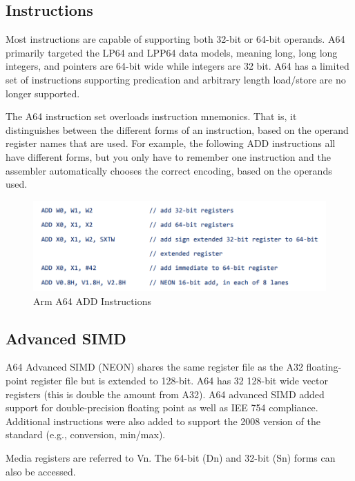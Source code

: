 \documentclass[12pt]{article}
\begin{document}
\subsection{Instructions}
\hspace{\parindent}Most instructions are capable of supporting both 32-bit or 64-bit operands. A64 primarily targeted the LP64 and LPP64 data models, meaning long, long long integers, and pointers are 64-bit wide while integers are 32 bit. A64 has a limited set of instructions supporting predication and arbitrary length load/store are no longer supported.\cite{a64instr2}\par
The A64 instruction set overloads instruction mnemonics. That is, it distinguishes between the
different forms of an instruction, based on the operand register names that are used. For example,
the following ADD instructions all have different forms, but you only have to remember one
instruction and the assembler automatically chooses the correct encoding, based on the operands
used.\cite{a64wiki}

\begin{figure}[H]
\begin{center}
\includegraphics[width=1\linewidth]{imgs/instr1.png}
\caption{Arm A64 ADD Instructions}
\label{a64add}
\end{center}
\end{figure}

\subsection{Advanced SIMD}
\hspace{\parindent}A64 Advanced SIMD (NEON) shares the same register file as the A32 floating-point register file but is extended to 128-bit. A64 has 32 128-bit wide vector registers (this is double the amount from A32). A64 advanced SIMD added support for double-precision floating point as well as IEE 754 compliance. Additional instructions were also added to support the 2008 version of the standard (e.g., conversion, min/max).\cite{a64instr2}\par
Media registers are referred to Vn. The 64-bit (Dn) and 32-bit (Sn) forms can also be accessed.
\end{document}
